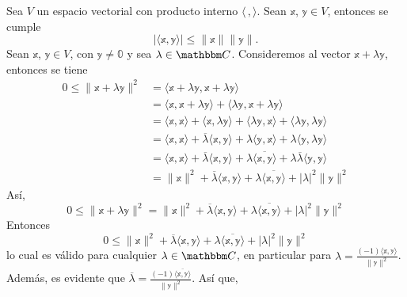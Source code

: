 \begin{theorem}
    Sea $V$ un espacio vectorial con producto interno $\langle \, , \rangle$. Sean $\mathbb{x}$, $\mathbb{y} \in V$, entonces se cumple
    $$| \langle \mathbb{x}, \mathbb{y} \rangle | \leq \| \mathbb{x} \| \| \mathbb{y} \|.$$
    \demostracion Sean $\mathbb{x}$, $\mathbb{y} \in V$, con $\mathbb{y} \neq \mathbb{0}$ y sea $\lambda \in \CC$. Consideremos al vector $\mathbb{x} + \lambda \mathbb{y}$, entonces se tiene
    \begin{align*}
        0 \leq \| \mathbb{x} + \lambda \mathbb{y} \|^2 & = \langle \mathbb{x} + \lambda\mathbb{y}, \mathbb{x} + \lambda\mathbb{y} \rangle \\
        & = \langle \mathbb{x}, \mathbb{x} + \lambda \mathbb{y} \rangle + \langle \lambda \mathbb{y}, \mathbb{x} + \lambda\mathbb{y} \rangle \\
        & = \langle \mathbb{x}, \mathbb{x} \rangle + \langle \mathbb{x}, \lambda \mathbb{y} \rangle + \langle \lambda \mathbb{y}, \mathbb{x} \rangle + \langle \lambda \mathbb{y}, \lambda \mathbb{y} \rangle \\
        & = \langle \mathbb{x}, \mathbb{x} \rangle + \overline{\lambda} \langle \mathbb{x}, \mathbb{y} \rangle + \lambda \langle \mathbb{y}, \mathbb{x} \rangle + \lambda \langle \mathbb{y}, \lambda \mathbb{y} \rangle \\
        & = \langle \mathbb{x}, \mathbb{x} \rangle + \overline{\lambda} \langle \mathbb{x}, \mathbb{y} \rangle + \lambda \overline{\langle \mathbb{x}, \mathbb{y} \rangle} + \lambda\overline{\lambda} \langle \mathbb{y}, \mathbb{y} \rangle \\
        & = \| \mathbb{x} \|^2 + \overline{\lambda} \langle \mathbb{x}, \mathbb{y} \rangle + \lambda \overline{\langle \mathbb{x}, \mathbb{y} \rangle} + |\lambda|^2 \| \mathbb{y} \|^2
    \end{align*}
    Así,
    $$0 \leq \| \mathbb{x} + \lambda \mathbb{y} \|^2 = \| \mathbb{x} \|^2 + \overline{\lambda} \langle \mathbb{x}, \mathbb{y} \rangle + \lambda \overline{\langle \mathbb{x}, \mathbb{y} \rangle} + |\lambda|^2 \| \mathbb{y} \|^2$$
    Entonces
    \begin{equation}
        0 \leq \| \mathbb{x} \|^2 + \overline{\lambda} \langle \mathbb{x}, \mathbb{y} \rangle + \lambda \overline{\langle \mathbb{x}, \mathbb{y} \rangle} + |\lambda|^2 \| \mathbb{y} \|^2 \label{desigualdad-cauchy}
    \end{equation}
    lo cual es válido para cualquier $\lambda \in \CC$, en particular para $\displaystyle \lambda = \frac{(-1)\langle \mathbb{x}, \mathbb{y} \rangle}{\| \mathbb{y} \|^2}$. Además, es evidente que $\displaystyle \overline{\lambda} = \frac{(-1)\overline{\langle \mathbb{x}, \mathbb{y} \rangle}}{\| \mathbb{y} \|^2}$. Así que,

\end{theorem}
